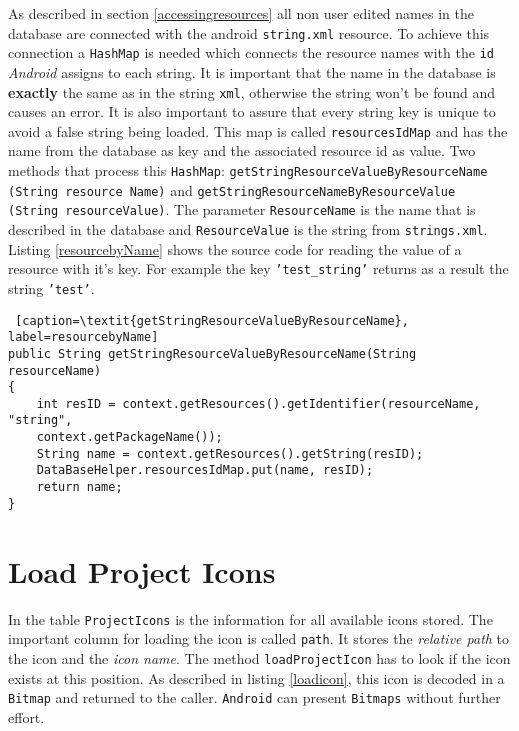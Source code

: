 As described in section \ref{accessingresources} all non user edited names in the database are connected with the android \texttt{string.xml} resource. To achieve this connection a \texttt{HashMap} is needed which connects the resource names with the \texttt{id} \textit{Android} assigns to each string. It is important that the name in the database is \textbf{exactly} the same as in the string \texttt{xml}, otherwise the string won't be found and causes an error. It is also important to assure that every string key is unique to avoid a false string being loaded. This map is called \texttt{resourcesIdMap} and has the name from the database as key and the associated resource id as value. Two methods that process this \texttt{HashMap}: \texttt{getStringResourceValueByResourceName} \texttt{(String resource Name)} and \texttt{getStringResourceNameByResourceValue (String resourceValue)}. The parameter \texttt{ResourceName} is the name that is described in the database and \texttt{ResourceValue} is the string from \texttt{strings.xml}.\\
Listing \ref{resourcebyName} shows the source code for reading the value of a resource with it's key. For example the key \texttt{'test\_string'} returns as a result the string \texttt{'test'}.
\begin{lstlisting} [caption=\textit{getStringResourceValueByResourceName}, label=resourcebyName] 
public String getStringResourceValueByResourceName(String resourceName)
{
	int resID = context.getResources().getIdentifier(resourceName, "string", 
	context.getPackageName());
	String name = context.getResources().getString(resID);
	DataBaseHelper.resourcesIdMap.put(name, resID);
	return name;
}
\end{lstlisting}

\section{Load Project Icons}\label{impl:loadProjectIcons}

In the table \texttt{ProjectIcons} is the information for all available icons stored. The important column for loading the icon is called \texttt{path}. It stores the \textit{relative path} to the icon and the \textit{icon name}. The method \texttt{loadProjectIcon} has to look if the icon exists at this position. As described in listing \ref{loadicon}, this icon is decoded in a \texttt{Bitmap} and returned to the caller. \texttt{Android} can present \texttt{Bitmaps} without further effort.

